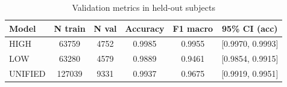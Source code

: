 \begin{table}[ht]
\centering
\caption{Validation metrics in held-out subjects}
\label{tab:validation_metrics}
\begin{tabular}{lccccc}
\hline
Model & N train & N val & Accuracy & F1 macro & 95\% CI (acc) \\
\hline
HIGH & 63759 & 4752 & 0.9985 & 0.9955 & [0.9970, 0.9993] \\
LOW & 63280 & 4579 & 0.9889 & 0.9461 & [0.9854, 0.9915] \\
UNIFIED & 127039 & 9331 & 0.9937 & 0.9675 & [0.9919, 0.9951] \\
\hline
\end{tabular}
\end{table}
